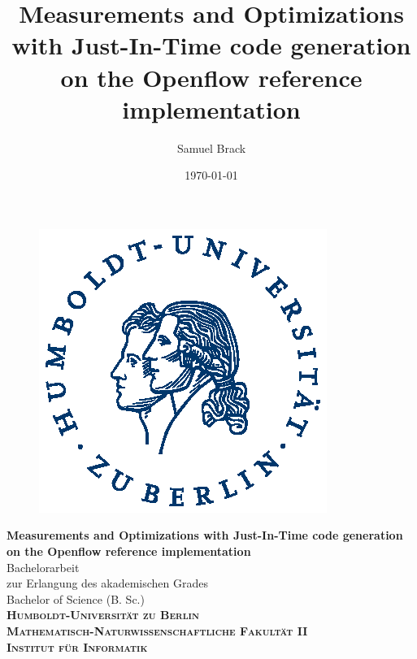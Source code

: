 \documentclass[a4paper,
		12pt,
		parskip=full,
		titlepage
		]{scrartcl}
\title{Measurements and Optimizations with Just-In-Time code generation on the Openflow reference implementation}
\author{Samuel Brack}
\date{\today}
\begin{document}
\thispagestyle{empty}

\hspace{20cm}
\vspace{-3cm}

\begin{figure}[H] \hspace{11cm}
\includegraphics[width=3.2 cm]{HU_Logo}
\end{figure}
\begin{center}
  \huge{\bf Measurements and Optimizations with Just-In-Time code generation on the Openflow reference implementation} \\ %
  \vspace{1cm}
  \LARGE  Bachelorarbeit \\ %
  \vspace{1cm}
  \Large zur Erlangung des akademischen Grades \\
  Bachelor of Science (B. Sc.)\\ %
  \vspace{1.5cm}
  {\large
    \bf{
      \scshape
      Humboldt-Universit\"at zu Berlin \\
      Mathematisch-Naturwissenschaftliche Fakult\"at II \\
      Institut f\"ur Informatik\\
    }
  } 
\enlargethispage{10\baselineskip}
\end{center}
\vspace {1 cm}%
\end{document}
